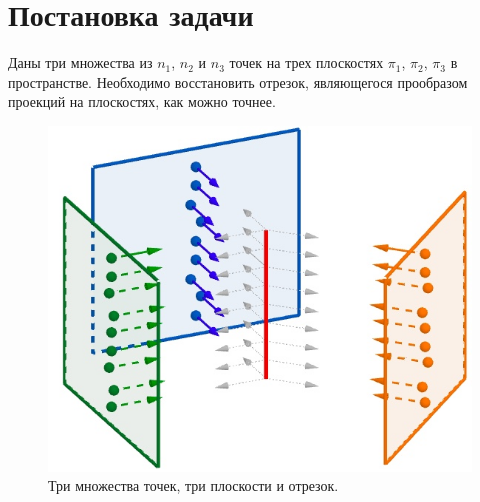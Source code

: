 \documentclass[article,final,14pt]{scrreprt}
\begin{document}
\newtheorem{theorem}{Теорема}

\newtheorem{problem}{Задача}[chapter]

\newtheorem{lemma}{Лемма}[chapter]

\newtheorem{clair}{Утверждение}[chapter]

\newtheorem{definition}{Определение}[chapter]

\newtheorem{property}{Свойство}[chapter]

\newtheorem{conseq}{Следствие}[chapter]

\newtheorem{properties}{Свойства}[chapter]

\newtheorem*{remark}{Замечание}

\newenvironment{Proof}       
	{\par\noindent{\bf Доказательство.}}
	{\hfill$\blacksquare$}

\newenvironment{solution}       
	{\par\noindent{\bf Решение.}}
	{\hfill$\blacksquare$}

\newcommand{\red}[1]{\textbf{\color{red}#1}}
\newcommand{\blue}[1]{\textbf{\color{blue}#1}}
\newcommand{\green}[1]{\textbf{\color{green}#1}}

\def\ton#1{1,2,\dots,#1}
\def\Set#1#2{\left\{#1\colon#2\right\}}
\def\MYdef{\mathrel{\stackrel{\rm def}=}}

\addto{}



\tableofcontents

\chapter{Постановка задачи}\label{task}

Даны три множества из $n_1$, $n_2$ и $n_3$ точек на трех плоскостях $\pi_1$, $\pi_2$, $\pi_3$ в пространстве. Необходимо восстановить отрезок, являющегося прообразом проекций на плоскостях, как можно точнее.

\begin{figure}[h]
	{ \noindent \centering
	\includegraphics[scale=0.8]{10}
	\caption{Три множества точек, три плоскости и отрезок.}
	}
\end{figure}
\end{document}
